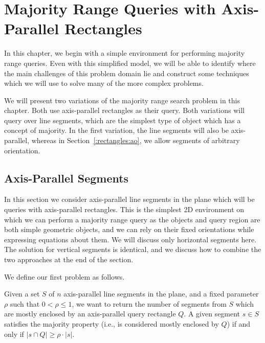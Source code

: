 \chapter{Majority Range Queries with Axis-Parallel Rectangles}
\label{:rectangles}

In this chapter, we begin with a simple environment for performing majority range queries. Even with this simplified model, we will be able to identify where the main challenges of this problem domain lie and construct some techniques which we will use to solve many of the more complex problems.

We will present two variations of the majority range search problem in this chapter. Both use axis-parallel rectangles as their query. Both variations will query over line segments, which are the simplest type of object which has a concept of majority. In the first variation, the line segments will also be axis-parallel, whereas in Section~\ref{:rectangles:ao}, we allow segments of arbitrary orientation.

\section{Axis-Parallel Segments}
\label{:rectangles:ap}

In this section we consider axis-parallel line segments in the plane which will be queries with axis-parallel rectangles.  This is the simplest 2D environment on which we can perform a majority range query as the objects and query region are both simple geometric objects, and we can rely on their fixed orientations while expressing equations about them. We will discuss only horizontal segments here.  The solution for vertical segments is identical, and we discuss how to combine the two approaches at the end of the section.

We define our first problem as follows.

\begin{problem}
Given a set $S$ of $n$ axis-parallel line segments in the plane, and a fixed parameter $\rho$ such that $0 < \rho \leq 1$, we want to return the number of segments from $S$ which are mostly enclosed by an axis-parallel query rectangle $Q$. A given segment $s \in S$ satisfies the majority property (i.e., is considered mostly enclosed by $Q$) if and only if $|s \cap Q| \geq \rho \cdot |s|$.
\end{problem}


